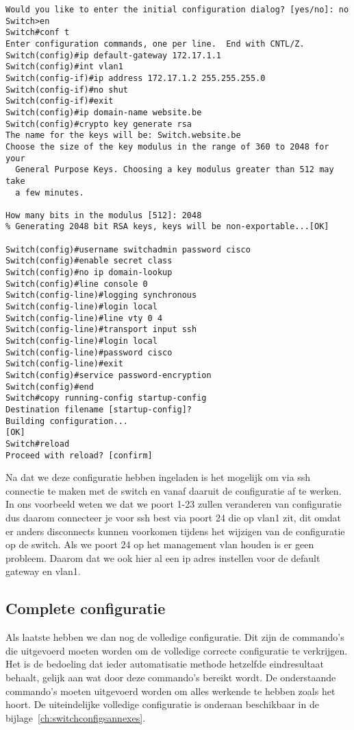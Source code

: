 \begin{center}
\begin{verbatim}
Would you like to enter the initial configuration dialog? [yes/no]: no
Switch>en
Switch#conf t
Enter configuration commands, one per line.  End with CNTL/Z.
Switch(config)#ip default-gateway 172.17.1.1
Switch(config)#int vlan1
Switch(config-if)#ip address 172.17.1.2 255.255.255.0
Switch(config-if)#no shut
Switch(config-if)#exit
Switch(config)#ip domain-name website.be
Switch(config)#crypto key generate rsa
The name for the keys will be: Switch.website.be
Choose the size of the key modulus in the range of 360 to 2048 for your
  General Purpose Keys. Choosing a key modulus greater than 512 may take
  a few minutes.

How many bits in the modulus [512]: 2048
% Generating 2048 bit RSA keys, keys will be non-exportable...[OK]

Switch(config)#username switchadmin password cisco
Switch(config)#enable secret class
Switch(config)#no ip domain-lookup
Switch(config)#line console 0
Switch(config-line)#logging synchronous
Switch(config-line)#login local
Switch(config-line)#line vty 0 4
Switch(config-line)#transport input ssh
Switch(config-line)#login local
Switch(config-line)#password cisco
Switch(config-line)#exit
Switch(config)#service password-encryption
Switch(config)#end
Switch#copy running-config startup-config
Destination filename [startup-config]? 
Building configuration...
[OK]
Switch#reload
Proceed with reload? [confirm]
\end{verbatim}
\end{center}

Na dat we deze configuratie hebben ingeladen is het mogelijk om via ssh connectie te maken met de switch en vanaf daaruit de configuratie af te werken. In ons voorbeeld weten we dat we poort 1-23 zullen veranderen van configuratie dus daarom connecteer je voor ssh best via poort 24 die op vlan1 zit, dit omdat er anders disconnects kunnen voorkomen tijdens het wijzigen van de configuratie op de switch. Als we poort 24 op het management vlan houden is er geen probleem. Daarom dat we ook hier al een ip adres instellen voor de default gateway en vlan1.

\subsection{Complete configuratie}
\label{sec:complete configuratie}
Als laatste hebben we dan nog de volledige configuratie. Dit zijn de commando's die uitgevoerd moeten worden om de volledige correcte configuratie te verkrijgen. Het is de bedoeling dat ieder automatisatie methode hetzelfde eindresultaat behaalt, gelijk aan wat door deze commando's bereikt wordt. De onderstaande commando's moeten uitgevoerd worden om alles werkende te hebben zoals het hoort. De uiteindelijke volledige configuratie is onderaan beschikbaar in de bijlage~\ref{ch:switchconfigsannexes}.
 
